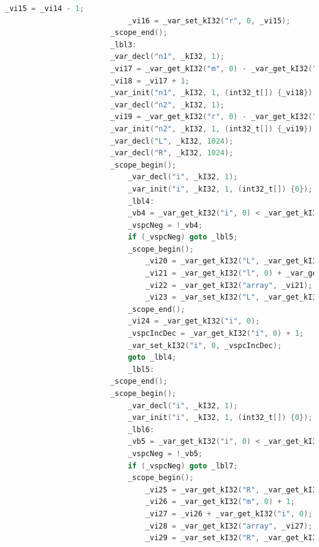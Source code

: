 \documentclass[a4paper]{article}
\begin{document}
\begin{lstlisting}[language=C]
                            _vi15 = _vi14 - 1;
                            _vi16 = _var_set_kI32("r", 0, _vi15);
                        _scope_end();
                        _lbl3:
                        _var_decl("n1", _kI32, 1);
                        _vi17 = _var_get_kI32("m", 0) - _var_get_kI32("l", 0);
                        _vi18 = _vi17 + 1;
                        _var_init("n1", _kI32, 1, (int32_t[]) {_vi18});
                        _var_decl("n2", _kI32, 1);
                        _vi19 = _var_get_kI32("r", 0) - _var_get_kI32("m", 0);
                        _var_init("n2", _kI32, 1, (int32_t[]) {_vi19});
                        _var_decl("L", _kI32, 1024);
                        _var_decl("R", _kI32, 1024);
                        _scope_begin();
                            _var_decl("i", _kI32, 1);
                            _var_init("i", _kI32, 1, (int32_t[]) {0});
                            _lbl4:
                            _vb4 = _var_get_kI32("i", 0) < _var_get_kI32("n1", 0);
                            _vspcNeg = !_vb4;
                            if (_vspcNeg) goto _lbl5;
                            _scope_begin();
                                _vi20 = _var_get_kI32("L", _var_get_kI32("i", 0));
                                _vi21 = _var_get_kI32("l", 0) + _var_get_kI32("i", 0);
                                _vi22 = _var_get_kI32("array", _vi21);
                                _vi23 = _var_set_kI32("L", _var_get_kI32("i", 0), _vi22);
                            _scope_end();
                            _vi24 = _var_get_kI32("i", 0);
                            _vspcIncDec = _var_get_kI32("i", 0) + 1;
                            _var_set_kI32("i", 0, _vspcIncDec);
                            goto _lbl4;
                            _lbl5:
                        _scope_end();
                        _scope_begin();
                            _var_decl("i", _kI32, 1);
                            _var_init("i", _kI32, 1, (int32_t[]) {0});
                            _lbl6:
                            _vb5 = _var_get_kI32("i", 0) < _var_get_kI32("n2", 0);
                            _vspcNeg = !_vb5;
                            if (_vspcNeg) goto _lbl7;
                            _scope_begin();
                                _vi25 = _var_get_kI32("R", _var_get_kI32("i", 0));
                                _vi26 = _var_get_kI32("m", 0) + 1;
                                _vi27 = _vi26 + _var_get_kI32("i", 0);
                                _vi28 = _var_get_kI32("array", _vi27);
                                _vi29 = _var_set_kI32("R", _var_get_kI32("i", 0), _vi28);

\end{lstlisting}
\end{document}
